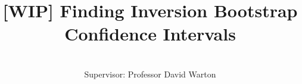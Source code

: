 \documentclass[honours,12pt]{UNSWthesis}
\title{[WIP] Finding Inversion Bootstrap Confidence Intervals}
\author{\Authornameonly\\{\bigskip}Supervisor: Professor David Warton}
\begin{document}
%
%

\beforepreface

\afterpage{\blankpage}







\afterpreface

\afterpage{\blankpage}

%
%
















\end{document}
